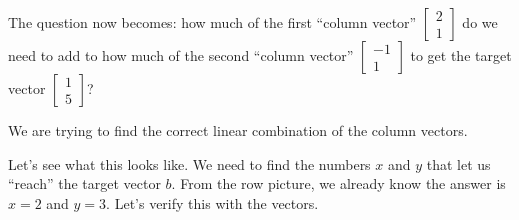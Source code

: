 \documentclass[
  letterpaper,
  DIV=11,
  numbers=noendperiod]{scrreprt}
\begin{document}
The question now becomes: how much of the first ``column vector''
\(\begin{bmatrix} 2 \\ 1\end{bmatrix}\) do we need to add to how much of
the second ``column vector'' \(\begin{bmatrix} -1 \\ 1\end{bmatrix}\) to
get the target vector \(\begin{bmatrix} 1 \\ 5\end{bmatrix}\)?

We are trying to find the correct linear combination of the column
vectors.

Let's see what this looks like. We need to find the numbers \(x\) and
\(y\) that let us ``reach'' the target vector \(b\). From the row
picture, we already know the answer is \(x=2\) and \(y=3\). Let's verify
this with the vectors.
\end{document}
